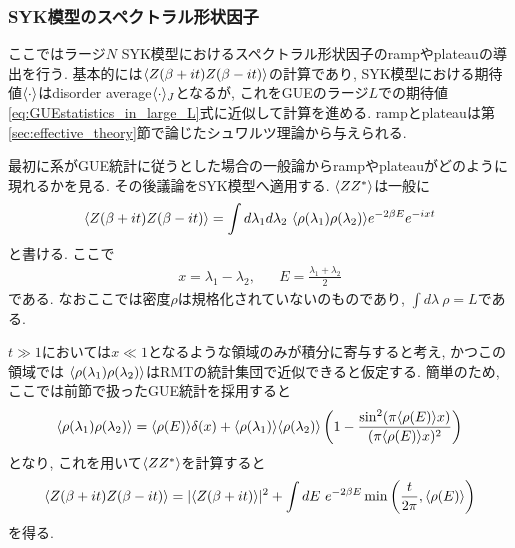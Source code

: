 \subsubsection{SYK模型のスペクトラル形状因子}
ここではラージ$N$ SYK模型におけるスペクトラル形状因子のrampやplateauの導出を行う. 
基本的には$\langle Z(\beta + it)Z(\beta - it) \rangle$の計算であり, 
SYK模型における期待値$\langle \cdot \rangle$はdisorder average$\langle \cdot \rangle_J$となるが, 
これをGUEのラージ$L$での期待値\eqref{eq:GUEstatistics_in_large_L}式に近似して計算を進める. 
rampとplateauは第\ref{sec:effective_theory}節で論じたシュワルツ理論から与えられる. 

最初に系がGUE統計に従うとした場合の一般論からrampやplateauがどのように現れるかを見る. 
その後議論をSYK模型へ適用する. 
$\langle ZZ^* \rangle$は一般に
\begin{align}
	\average{Z(\beta + it)Z(\beta - it)}
	= \int d\lambda_1d\lambda_2\ \average{\rho(\lambda_1)\rho(\lambda_2)}
		e^{-2\beta E}e^{-ixt}
\end{align}
と書ける. ここで
\begin{align}
	x = \lambda_1 - \lambda_2,\hspace{20pt}
	E = \frac{\lambda_1 + \lambda_2}{2}
\end{align}
である. 
なおここでは密度$\rho$は規格化されていないのものであり, $\int d\lambda\ \rho = L$である. 

$t \gg 1$においては$x \ll 1$となるような領域のみが積分に寄与すると考え, かつこの領域では
$\langle \rho(\lambda_1)\rho(\lambda_2) \rangle$はRMTの統計集団で近似できると仮定する. 
簡単のため, ここでは前節で扱ったGUE統計を採用すると
\begin{align}
	\langle \rho(\lambda_1)\rho(\lambda_2) \rangle
	= \langle \rho(E) \rangle\delta(x)
		+ \langle \rho(\lambda_1) \rangle\langle \rho(\lambda_2) \rangle
		\left(1 - 
			\frac{\sin^2(\pi\langle \rho(E) \rangle x)}{(\pi\langle \rho(E) \rangle x)^2}		
		\right)
\end{align}
となり, これを用いて$\langle ZZ^* \rangle$を計算すると
\begin{align}
	\langle Z(\beta + it)Z(\beta - it) \rangle
	= |\langle Z(\beta + it) \rangle|^2 + \int dE\ e^{-2\beta E}
		\min\left(\frac{t}{2\pi}, \langle \rho(E) \rangle\right)
	\label{eq:average_of_ZZ}
\end{align}
を得る. 

